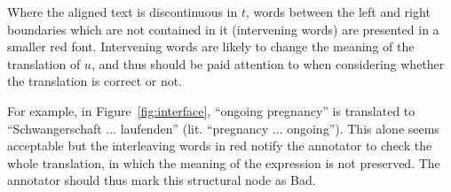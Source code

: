 \documentclass[11pt,letterpaper]{article}
\newcommand{\figref}[1]{Figure~\ref{#1}}
\newcommand{\bh}[1]{\footnote{\color{blue}BH: #1}}
\begin{document}
Where the aligned text is discontinuous in $t$, words between the left
and right boundaries which are not contained in it (intervening words)
are presented in a smaller red font. 
Intervening words are likely to change the meaning of the translation
of $u$, and thus should be paid attention to when considering whether the translation
is correct or not. 

For example, 
in \figref{fig:interface}, ``ongoing pregnancy'' is translated to
``Schwangerschaft ... laufenden'' (lit. ``pregnancy ... ongoing''). This alone
seems acceptable but the interleaving words in red notify the annotator to check
the whole translation, in which the meaning of the expression is not preserved.
The annotator should thus mark this structural node as Bad.



\end{document}
